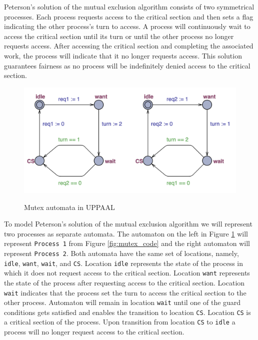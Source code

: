 \noindent
Peterson's solution of the mutual exclusion algorithm consists of two symmetrical processes. Each process requests access to the critical section and then sets a flag indicating the other process's turn to access. A process will continuously wait to access the critical section until its turn or until the other process no longer requests access. After accessing the critical section and completing the associated work, the process will indicate that it no longer requests access. This solution guarantees fairness as no process will be indefinitely denied access to the critical section.


\begin{figure}[H]
\caption{Mutex automata in UPPAAL \cite{SmallTutorial2009}}
\includegraphics[width=\textwidth]{images/mutex.png}
\label{fig:mutex_uppaal}
\end{figure}

\noindent
To model Peterson's solution of the mutual exclusion algorithm we will represent two processes as separate automata. The automaton on the left in Figure \ref{fig:mutex_uppaal} will represent \texttt{Process 1} from Figure \ref{fig:mutex_code} and the right automaton will represent \texttt{Process 2}. Both automata have the same set of locations, namely, \texttt{idle}, \texttt{want}, \texttt{wait}, and \texttt{CS}. Location \texttt{idle} represents the state of the process in which it does not request access to the critical section. Location \texttt{want} represents the state of the process after requesting access to the critical section. Location \texttt{wait} indicates that the process set the turn to access the critical section to the other process. Automaton will remain in location \texttt{wait} until one of the guard conditions gets satisfied and enables the transition to location \texttt{CS}. Location \texttt{CS} is a critical section of the process. Upon transition from location \texttt{CS} to \texttt{idle} a process will no longer request access to the critical section. 



